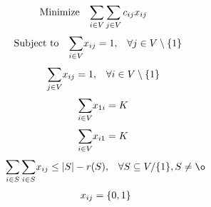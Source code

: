 \begin{equation}
    \begin{array}{ll@{}ll}
        \text{Minimize} & \displaystyle\sum\limits_{i \in V}\sum\limits_{j \in V} c_{ij}&x_{ij} &\\
    \end{array}
\end{equation}
\begin{equation}
    \begin{array}{ll@{}ll}
        \text{Subject to}&\displaystyle\sum\limits_{i \in V}   &x_{ij} = 1,  &\forall j \in V \setminus \{1\}\\
    \end{array}
\end{equation}
\begin{equation}
    \begin{array}{ll@{}ll}
        & \displaystyle\sum\limits_{j \in V}   &x_{ij} = 1,  &\forall i \in V \setminus \{1\}\\
    \end{array}
\end{equation}
\begin{equation}
    \begin{array}{ll@{}ll}
        & \displaystyle\sum\limits_{i \in V}   &x_{1i} = K\\
    \end{array}
\end{equation}
\begin{equation}
    \begin{array}{ll@{}ll}
        & \displaystyle\sum\limits_{i \in V}   &x_{i1} = K\\
    \end{array}
\end{equation}
\begin{equation}
    \begin{array}{ll@{}ll@{}ll}
        & \displaystyle\sum\limits_{i \in S}\sum\limits_{i \in S}  &x_{ij} \leq |S| - r(S), &\forall S \subseteq V/ \{1\} , S \neq \o \\
    \end{array}
\end{equation}
\begin{equation}
    \begin{array}{ll@{}ll@{}ll}
        & x_{ij} = \{0,1\}\\
    \end{array}
\end{equation}

\vspace{1cm}

